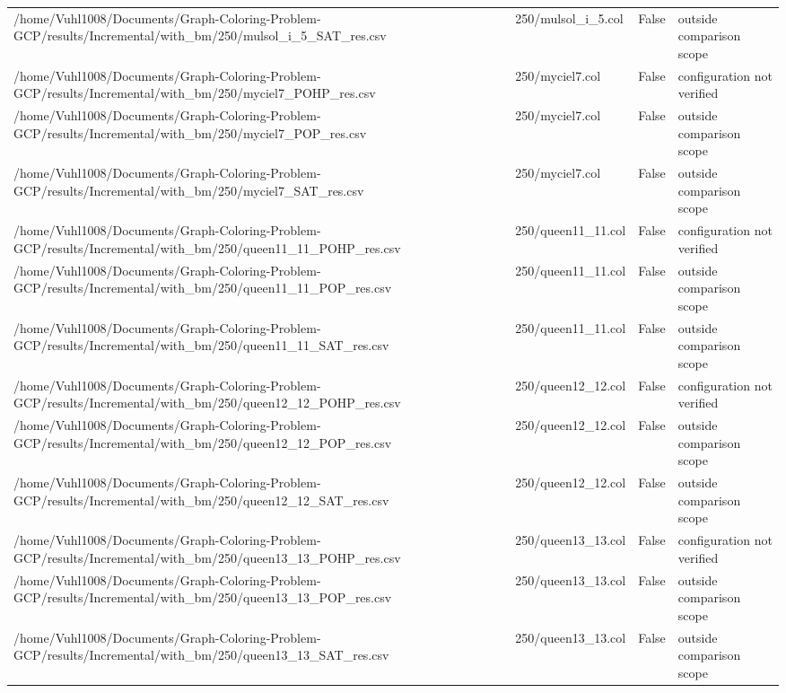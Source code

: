 \begin{table}[htbp]
\begin{tabular}{llll}
/home/Vuhl1008/Documents/Graph-Coloring-Problem-GCP/results/Incremental/with\_bm/250/mulsol\_i\_5\_SAT\_res.csv & 250/mulsol\_i\_5.col & False & outside comparison scope \\
/home/Vuhl1008/Documents/Graph-Coloring-Problem-GCP/results/Incremental/with\_bm/250/myciel7\_POHP\_res.csv & 250/myciel7.col & False & configuration not verified \\
/home/Vuhl1008/Documents/Graph-Coloring-Problem-GCP/results/Incremental/with\_bm/250/myciel7\_POP\_res.csv & 250/myciel7.col & False & outside comparison scope \\
/home/Vuhl1008/Documents/Graph-Coloring-Problem-GCP/results/Incremental/with\_bm/250/myciel7\_SAT\_res.csv & 250/myciel7.col & False & outside comparison scope \\
/home/Vuhl1008/Documents/Graph-Coloring-Problem-GCP/results/Incremental/with\_bm/250/queen11\_11\_POHP\_res.csv & 250/queen11\_11.col & False & configuration not verified \\
/home/Vuhl1008/Documents/Graph-Coloring-Problem-GCP/results/Incremental/with\_bm/250/queen11\_11\_POP\_res.csv & 250/queen11\_11.col & False & outside comparison scope \\
/home/Vuhl1008/Documents/Graph-Coloring-Problem-GCP/results/Incremental/with\_bm/250/queen11\_11\_SAT\_res.csv & 250/queen11\_11.col & False & outside comparison scope \\
/home/Vuhl1008/Documents/Graph-Coloring-Problem-GCP/results/Incremental/with\_bm/250/queen12\_12\_POHP\_res.csv & 250/queen12\_12.col & False & configuration not verified \\
/home/Vuhl1008/Documents/Graph-Coloring-Problem-GCP/results/Incremental/with\_bm/250/queen12\_12\_POP\_res.csv & 250/queen12\_12.col & False & outside comparison scope \\
/home/Vuhl1008/Documents/Graph-Coloring-Problem-GCP/results/Incremental/with\_bm/250/queen12\_12\_SAT\_res.csv & 250/queen12\_12.col & False & outside comparison scope \\
/home/Vuhl1008/Documents/Graph-Coloring-Problem-GCP/results/Incremental/with\_bm/250/queen13\_13\_POHP\_res.csv & 250/queen13\_13.col & False & configuration not verified \\
/home/Vuhl1008/Documents/Graph-Coloring-Problem-GCP/results/Incremental/with\_bm/250/queen13\_13\_POP\_res.csv & 250/queen13\_13.col & False & outside comparison scope \\
/home/Vuhl1008/Documents/Graph-Coloring-Problem-GCP/results/Incremental/with\_bm/250/queen13\_13\_SAT\_res.csv & 250/queen13\_13.col & False & outside comparison scope \\

\end{tabular}
\end{table}
